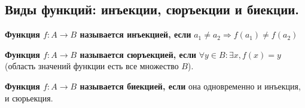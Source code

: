 \subsection{Виды функций: инъекции, сюръекции и биекции.}

 \textbf{Функция $f: A \rightarrow B$ называется инъекцией, если} $a_1 \neq a_2 \Rightarrow f(a_1) \neq f(a_2)$

   \textbf{Функция $f: A \rightarrow B$ называется сюръекцией, если} $\forall y \in B \colon \exists x, f(x) = y$ (область значений функции есть все множество $B$).

   \textbf{Функция $f: A \rightarrow B$ называется биекцией, если} она одновременно и инъекция, и сюрьекция.
